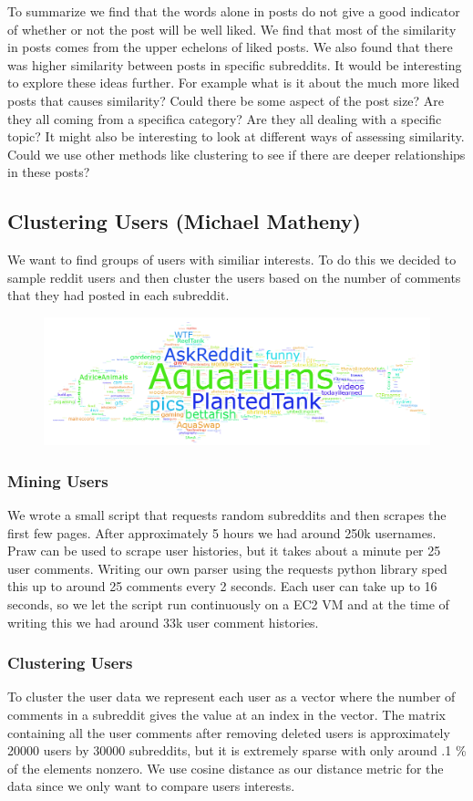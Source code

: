 \documentclass[12pt]{article}
\numberwithin{equation}{section}
\begin{document}
  To summarize we find that the words alone in posts do not give a good indicator of whether or not the post will be well liked.  We find that most of the similarity in posts comes from the upper echelons of liked posts.  We also found that there was higher similarity between posts in specific subreddits.  It would be interesting to explore these ideas further.  For example what is it about the much more liked posts that causes similarity?  Could there be some aspect of the post size?  Are they all coming from a specifica category?  Are they all dealing with a specific topic?  It might also be interesting to look at different ways of assessing similarity.  Could we use other methods like clustering to see if there are deeper relationships in these posts?

\subsection*{Clustering Users (Michael Matheny)}
We want to find groups of users with similiar interests. To do this we decided to sample reddit users and then cluster the users based on the number of comments that they had posted in each subreddit. 
\begin{figure}[h!]
	\includegraphics[scale=.4]{fish_94.png}
\end{figure}

\subsubsection*{Mining Users}
 We wrote a small script that requests random subreddits and then scrapes the first few pages. After approximately 5 hours we had around 250k usernames. Praw can be used to scrape user histories, but it takes about a minute per 25 user comments. 
 Writing our own parser using the requests python library sped this up to around 25 comments every 2 seconds. Each user can take up to 16 seconds, so we let the script run continuously on a EC2 VM and at the time of writing this we had 
 around 33k user comment histories. 
\subsubsection*{Clustering Users}
To cluster the user data we represent each user as a vector where the number of comments in a subreddit gives 
the value at an index in the vector. The matrix containing all the user comments after removing 
deleted users is approximately 20000 users by 30000 subreddits, but it is extremely sparse with only around .1 \%
of the elements nonzero. 
We use cosine distance as our distance metric for the data since we only want to compare users interests. 
\end{document}
